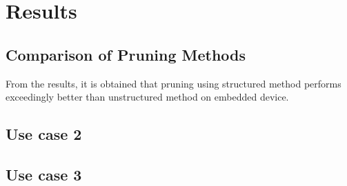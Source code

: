 

    \chapter{Results}

    \section{Comparison of Pruning Methods}

    From the results, it is obtained that pruning using structured method performs exceedingly better than unstructured method on embedded device.

    \section{Use case 2}

    \section{Use case 3}

